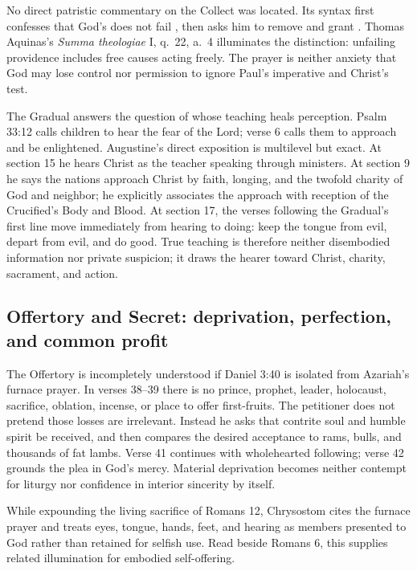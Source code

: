 \begin{deepstudy}
No direct patristic commentary on the Collect was located. Its syntax first confesses that God's  does not fail , then asks him to remove  and grant . Thomas Aquinas's \emph{Summa theologiae} I, q.~22, a.~4 illuminates the distinction: unfailing providence includes free causes acting freely. The prayer is neither anxiety that God may lose control nor permission to ignore Paul's imperative and Christ's test.

The Gradual answers the question of whose teaching heals perception. Psalm 33:12 calls children to hear the fear of the Lord; verse 6 calls them to approach and be enlightened. Augustine's direct exposition is multilevel but exact. At section 15 he hears Christ as the teacher speaking through ministers. At section 9 he says the nations approach Christ by faith, longing, and the twofold charity of God and neighbor; he explicitly associates the approach with reception of the Crucified's Body and Blood. At section 17, the verses following the Gradual's first line move immediately from hearing to doing: keep the tongue from evil, depart from evil, and do good. True teaching is therefore neither disembodied information nor private suspicion; it draws the hearer toward Christ, charity, sacrament, and action.

\sectionguard
\subsection*{Offertory and Secret: deprivation, perfection, and common profit\enspace{}}

The Offertory is incompletely understood if Daniel 3:40 is isolated from Azariah's furnace prayer. In verses 38--39 there is no prince, prophet, leader, holocaust, sacrifice, oblation, incense, or place to offer first-fruits. The petitioner does not pretend those losses are irrelevant. Instead he asks that contrite soul and humble spirit be received, and then compares the desired acceptance to rams, bulls, and thousands of fat lambs. Verse 41 continues with wholehearted following; verse 42 grounds the plea in God's mercy. Material deprivation becomes neither contempt for liturgy nor confidence in interior sincerity by itself.

While expounding the living sacrifice of Romans 12, Chrysostom cites the furnace prayer and treats eyes, tongue, hands, feet, and hearing as members presented to God rather than retained for selfish use. Read beside Romans 6, this supplies related illumination for embodied self-offering.


\end{deepstudy}
